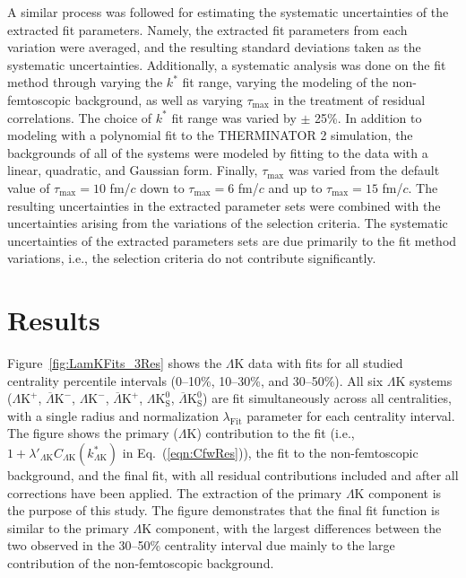 \documentclass[ALICE,manyauthors]{cernphprep}
\newcommand{\kstar}{$k^{*}$\xspace}
\newcommand{\LamK}{$\Lambda$K\xspace}
\newcommand{\LamKchP}{$\Lambda\mathrm{K^{+}}$\xspace}
\newcommand{\ALamKchM}{$\overline{\Lambda}\mathrm{K^{-}}$\xspace}
\newcommand{\LamKchM}{$\Lambda\mathrm{K^{-}}$\xspace}
\newcommand{\ALamKchP}{$\overline{\Lambda}\mathrm{K^{+}}$\xspace}
\newcommand{\LamKs}{$\Lambda\mathrm{K^{0}_{S}}$\xspace}
\newcommand{\ALamKs}{$\overline{\Lambda}\mathrm{K^{0}_{S}}$\xspace}
\begin{document}
A similar process was followed for estimating the systematic uncertainties of the extracted fit parameters.
Namely, the extracted fit parameters from each variation were averaged, and the resulting standard deviations taken as the systematic uncertainties.
Additionally, a systematic analysis was done on the fit method through varying the \kstar fit range, varying the modeling of the non-femtoscopic background, as well as varying $\tau_{\mathrm{max}}$ in the treatment of residual correlations.
The choice of \kstar fit range was varied by $\pm$ 25\%.
In addition to modeling with a polynomial fit to the THERMINATOR 2 simulation, the backgrounds of all of the systems were modeled by fitting to the data with a linear, quadratic, and Gaussian form.
Finally, $\tau_{\mathrm{max}}$ was varied from the default value of $\tau_{\mathrm{max}} = 10$ fm/$c$ down to $\tau_{\mathrm{max}} = 6$ fm/$c$ and up to $\tau_{\mathrm{max}} = 15$ fm/$c$.
The resulting uncertainties in the extracted parameter sets were combined with the uncertainties arising from the variations of the selection criteria.
The systematic uncertainties of the extracted parameters sets are due primarily to the fit method variations, i.e., the selection criteria do not contribute significantly.


\section{Results}
\label{sec:Results}

Figure~\ref{fig:LamKFits_3Res} shows the \LamK data with fits for all studied centrality percentile intervals (0--10\%, 10--30\%, and 30--50\%). 
All six \LamK systems (\LamKchP, \ALamKchM, \LamKchM, \ALamKchP, \LamKs, \ALamKs) are fit simultaneously across all centralities, with a single radius and normalization $\lambda_{\mathrm{Fit}}$ parameter for each centrality interval. 
The figure shows the primary (\LamK) contribution to the fit (i.e., $1 + \lambda'_{\Lambda\mathrm{K}}C_{\Lambda\mathrm{K}}(k^{*}_{\Lambda\mathrm{K}})$ in Eq.~(\ref{eqn:CfwRes})), the fit to the non-femtoscopic background, and the final fit, with all residual contributions included and after all corrections have been applied.
The extraction of the primary \LamK component is the purpose of this study.
The figure demonstrates that the final fit function is similar to the primary \LamK component, with the largest differences between the two observed in the 30--50\% centrality interval due mainly to the large contribution of the non-femtoscopic background.
\end{document}
